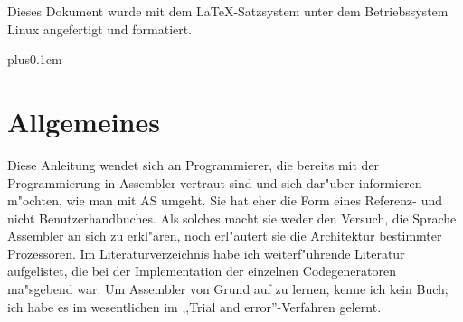 \documentclass[12pt,a4paper,twoside]{report}
\newif\ifelektor
\newcommand{\asname}{AS}
\begin{document}
\vspace{6cm}

Dieses Dokument wurde mit dem LaTeX-Satzsystem unter dem Betriebssystem
Linux angefertigt und formatiert.

\clearpage


\ifelektor
\thispagestyle{empty} \
\clearpage
\thispagestyle{empty} \
\clearpage
\fi


{\parskip 0cm plus0.1cm \tableofcontents}


\cleardoublepage
\chapter{Allgemeines}

Diese Anleitung wendet sich an Programmierer, die bereits mit der Programmierung in Assembler
vertraut sind und sich dar"uber informieren m"ochten, wie man mit \asname{} umgeht.  Sie
hat eher die Form eines Referenz- und nicht Benutzerhandbuches.  Als solches
macht sie weder den Versuch, die Sprache Assembler an sich zu erkl"aren, noch
erl"autert sie die Architektur bestimmter Prozessoren.  Im Literaturverzeichnis
habe ich weiterf"uhrende Literatur aufgelistet, die bei der Implementation der
einzelnen Codegeneratoren ma"sgebend war.  Um Assembler von Grund auf zu
lernen, kenne ich kein Buch; ich habe es im wesentlichen im ,,Trial and
error''-Verfahren gelernt.

\end{document}
